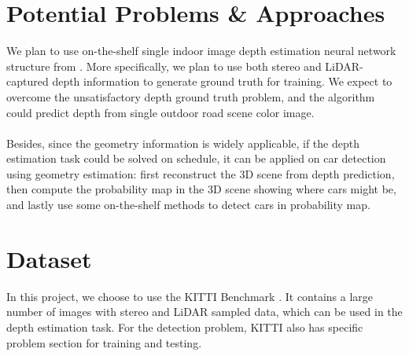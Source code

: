 \documentclass[a4paper]{article}
\begin{document}
\section{Potential Problems \& Approaches}
We plan to use on-the-shelf single indoor image depth estimation neural network structure from \cite{eigen2015predicting}. More specifically, we plan to use both stereo and LiDAR-captured depth information to generate ground truth for training. We expect to overcome the unsatisfactory depth ground truth problem, and the algorithm could predict depth from single outdoor road scene color image.
\\\\
Besides, since the geometry information is widely applicable, if the depth estimation task could be solved on schedule, it can be applied on car detection using geometry estimation: first reconstruct the 3D scene from depth prediction, then compute the probability map in the 3D scene showing where cars might be, and lastly use some on-the-shelf methods to detect cars in probability map.
 
\section{Dataset}
In this project, we choose to use the KITTI Benchmark \cite{Geiger2013IJRR}\cite{Fritsch2013ITSC}\cite{Menze2015CVPR}. It contains a large number of images with stereo and LiDAR sampled data, which can be used in the depth estimation task. For the detection problem, KITTI also has specific problem section for training and testing.



\end{document}

